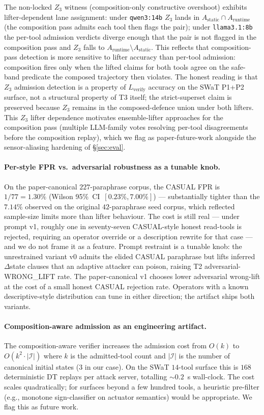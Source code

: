 The non-locked $Z_3$ witness (composition-only constructive overshoot)
exhibits lifter-dependent lane assignment: under \texttt{qwen3:14b}
$Z_3$ lands in $A_{\text{static}} \cap A_{\text{runtime}}$ (the
composition pass admits each tool then flags the pair); under
\texttt{llama3.1:8b} the per-tool admission verdicts diverge enough
that the pair is not flagged in the composition pass and $Z_3$ falls
to $A_{\text{runtime}} \setminus A_{\text{static}}$. This reflects
that composition-pass detection is more sensitive to lifter accuracy
than per-tool admission: composition fires only when the lifted
claims for both tools agree on the safe-band predicate the
composed trajectory then violates. The honest reading is that $Z_3$
admission detection is a property of $L_{\text{verify}}$ accuracy
on the SWaT P1+P2 surface, not a structural property of T3 itself;
the strict-superset claim is preserved because $Z_3$ remains in the
composed-defence union under both lifters. This $Z_3$ lifter
dependence motivates ensemble-lifter approaches for the composition
pass (multiple LLM-family votes resolving per-tool disagreements
before the composition replay), which we flag as paper-future-work
alongside the sensor-aliasing hardening of \S\ref{sec:eval}.

\paragraph{Per-style FPR vs.\ adversarial robustness as a tunable knob.}
On the paper-canonical $227$-paraphrase corpus, the CASUAL FPR is
$1/77 = 1.30\%$ (Wilson 95\%~CI~$[0.23\%, 7.00\%]$) --- substantially
tighter than the $7.14\%$ observed on the original $42$-paraphrase
seed corpus, which reflected sample-size limits more than lifter
behaviour. The cost is still real --- under prompt v1, roughly one in
seventy-seven CASUAL-style honest read-tools is rejected, requiring an
operator override or a description rewrite for that case --- and we
do not frame it as a feature. Prompt restraint is a tunable knob: the
unrestrained variant v0 admits the elided CASUAL paraphrase but lifts
inferred $\Delta$state clauses that an adaptive attacker can poison,
raising T2 adversarial-WRONG\_LIFT rate. The paper-canonical v1
chooses lower adversarial wrong-lift at the cost of a small honest
CASUAL rejection rate. Operators with a known descriptive-style
distribution can tune in either direction; the artifact ships both
variants.

\paragraph{Composition-aware admission as an engineering artifact.}
The composition-aware verifier increases the admission cost from
$O(k)$ to $O(k^2 \cdot |\mathcal{I}|)$ where $k$ is the admitted-tool
count and $|\mathcal{I}|$ is the number of canonical initial states
($3$ in our case). On the SWaT $14$-tool surface this is $168$
deterministic DT replays per attack server, totalling $\sim 0.2$~s
wall-clock. The cost scales quadratically; for surfaces beyond a
few hundred tools, a heuristic pre-filter (e.g., monotone
sign-classifier on actuator semantics) would be appropriate. We
flag this as future work.


